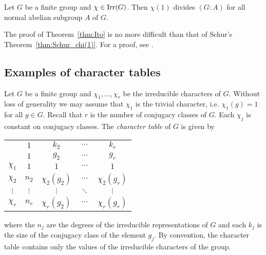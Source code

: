 \begin{theorem}[It\^o]
\label{thm:Ito}
Let $G$ be a finite group and $\chi\in\operatorname{Irr}(G)$. Then 
$\chi(1)$ divides $(G:A)$ for all normal abelian subgroup $A$ of $G$.  
\end{theorem}

The proof of Theorem~\ref{thm:Ito} is no more difficult than that of Schur's Theorem~\ref{thm:Schur_chi(1)}. For a proof, see \cite[\S8.1]{MR0450380}.


\subsection{Examples of character tables}

Let $G$ be a finite group and $\chi_1,\dots,\chi_r$ be the irreducible characters of $G$. Without loss of generality
we may assume that $\chi_1$ is the trivial character, i.e. $\chi_1(g)=1$ for all $g\in G$. 
Recall that $r$ is the number of conjugacy classes of $G$. Each $\chi_j$ is constant on conjugacy classes. 
The \emph{character table} of 
$G$ is given by 
\begin{center}
\begin{tabular}{|c|cccc|}
\hline 
 & $1$ & $k_{2}$ & $\cdots$ & $k_{r}$\tabularnewline
 & $1$ & $g_{2}$ & $\cdots$ & $g_{r}$\tabularnewline
\hline 
$\chi_{1}$ & $1$ & $1$ & $\cdots$ & $1$\tabularnewline
$\chi_{2}$ & $n_{2}$ & $\chi_{2}(g_{2})$ & $\cdots$ & $\chi_{2}(g_{r})$\tabularnewline
$\vdots$ & $\vdots$ & $\vdots$ & $\ddots$ & $\vdots$\tabularnewline
$\chi_{r}$ & $n_{r}$ & $\chi_{r}(g_{2})$ & $\cdots$ & $\chi_{r}(g_{r})$\tabularnewline
\hline
\end{tabular}
\end{center}
where the $n_j$ are the degrees of the irreducible representations of $G$ and each $k_j$ is 
the size of the conjugacy class of the element $g_j$. By convention, the character table
contains only the values of the irreducible characters of the group. 





